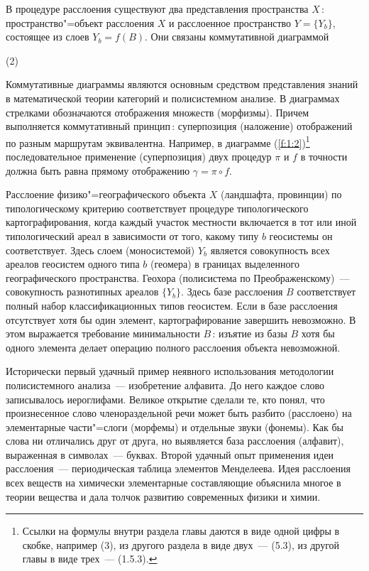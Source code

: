 \documentclass[14pt,draft,openany]{extbook}
\begin{document}
В процедуре расслоения существуют два представления пространства $X$\,: пространство"=объект расслоения $X$ и расслоенное пространство $Y = \{Y_b\}$, состоящее из слоев $Y_b = f(B)$. Они связаны коммутативной диаграммой

(2)\label{f:1:2}

Коммутативные диаграммы являются основным средством представления знаний в математической теории категорий и полисистемном анализе. В диаграммах стрелками обозначаются отображения множеств (морфизмы). Причем выполняется коммутативный принцип\,: суперпозиция (наложение) отображений по разным маршрутам эквивалентна. Например, в диаграмме (\ref{f:1:2})\footnote{Ссылки на формулы внутри раздела главы даются в виде одной цифры в скобке, например (3), из другого раздела в виде двух~--- (5.3), из другой главы в виде трех~--- (1.5.3).} последовательное применение (суперпозиция) двух процедур $\pi{}$ и $f$ в точности должна быть равна прямому отображению $\gamma = \pi{} \circ{} f$.

Расслоение физико"=географического объекта $X$ (ландшафта, провинции) по типологическому критерию соответствует процедуре типологического картографирования, когда каждый участок местности включается в тот или иной типологический ареал в зависимости от того, какому типу $b$ геосистемы он соответствует. Здесь слоем (моносистемой) $Y_b$ является совокупность всех ареалов геосистем одного типа $b$ (геомера) в границах выделенного географического пространства. Геохора (полисистема по Преображенскому)~--- совокупность разнотипных ареалов $\{Y_b\}$. Здесь базе расслоения $B$ соответствует полный набор классификационных типов геосистем. Если в базе расслоения отсутствует хотя бы один элемент, картографирование завершить невозможно. В этом выражается требование минимальности $B$\,: изъятие из базы $B$ хотя бы одного элемента делает операцию полного расслоения объекта невозможной.

Исторически первый удачный пример неявного использования методологии полисистемного анализа~--- изобретение алфавита. До него каждое слово записывалось иероглифами. Великое открытие сделали те, кто понял, что произнесенное слово членораздельной речи может быть разбито (расслоено) на элементарные части"=слоги (морфемы) и отдельные звуки (фонемы). Как бы слова ни отличались друг от друга, но выявляется база расслоения (алфавит), выраженная в символах~--- буквах. Второй удачный опыт применения идеи расслоения~--- периодическая таблица элементов Менделеева.  Идея расслоения всех веществ на химически элементарные составляющие объяснила многое в теории вещества и дала толчок развитию современных физики и химии.
\end{document}
